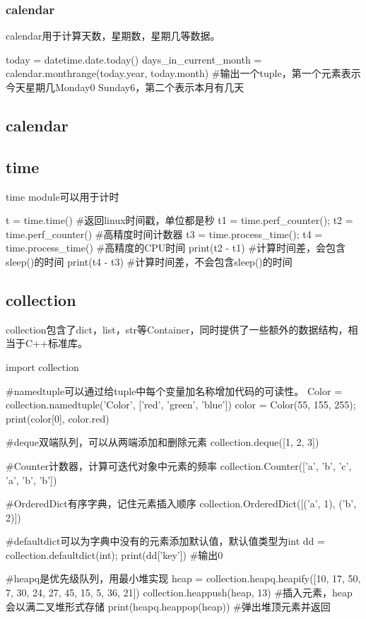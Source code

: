 \documentclass{article}
\begin{document}
      \subsubsection{calendar}
        calendar用于计算天数，星期数，星期几等数据。
        \begin{codeblock}[language=python, caption={calendar module}]
          today = datetime.date.today()
          days_in_current_month = calendar.monthrange(today.year, today.month)
          #输出一个tuple，第一个元素表示今天星期几Monday0 Sunday6，第二个表示本月有几天
        \end{codeblock}

    \subsection{calendar}

    \subsection{time}
      time module可以用于计时
      \begin{codeblock}[language=python, caption={time module}]
        t = time.time() #返回linux时间戳，单位都是秒
        t1 = time.perf_counter(); t2 = time.perf_counter() #高精度时间计数器
        t3 = time.process_time(); t4 = time.process_time() #高精度的CPU时间
        print(t2 - t1) #计算时间差，会包含sleep()的时间
        print(t4 - t3) #计算时间差，不会包含sleep()的时间
      \end{codeblock}

  \subsection{collection}
    collection包含了dict，list，str等Container，同时提供了一些额外的数据结构，相当于C++标准库。
    \begin{codeblock}[language=python, caption={namedtuple}]
      import collection

      #namedtuple可以通过给tuple中每个变量加名称增加代码的可读性。
      Color = collection.namedtuple('Color', ['red', 'green', 'blue'])
      color = Color(55, 155, 255); print(color[0], color.red)

      #deque双端队列，可以从两端添加和删除元素
      collection.deque([1, 2, 3])

      #Counter计数器，计算可迭代对象中元素的频率
      collection.Counter(['a', 'b', 'c', 'a', 'b', 'b'])

      #OrderedDict有序字典，记住元素插入顺序
      collection.OrderedDict([('a', 1), ('b', 2)])
      
      #defaultdict可以为字典中没有的元素添加默认值，默认值类型为int
      dd = collection.defaultdict(int); print(dd['key']) #输出0 
      
      #heapq是优先级队列，用最小堆实现
      heap = collection.heapq.heapify([10, 17, 50, 7, 30, 24, 27, 45, 15, 5, 36, 21])
      collection.heappush(heap, 13) #插入元素，heap会以满二叉堆形式存储
      print(heapq.heappop(heap)) #弹出堆顶元素并返回
    \end{codeblock}
\end{document}
